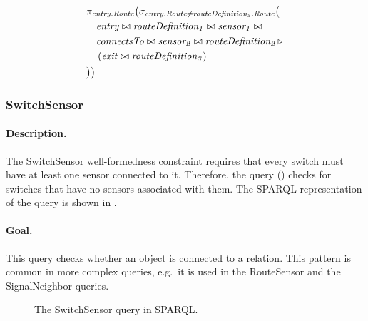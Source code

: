 \begin{align*}
& \pi_{\mathit{entry.Route}} \big( \sigma_{\mathit{entry.Route} \neq \mathit{routeDefinition_2.Route}} \big( \\
& \quad \mathit{entry} \bowtie \mathit{routeDefinition_1} \bowtie \mathit{sensor_1} \bowtie \\
& \quad \mathit{connectsTo} \bowtie \mathit{sensor_2} \bowtie \mathit{routeDefinition_2} \, \triangleright \, \\
& \quad \left( \mathit{exit} \bowtie \mathit{routeDefinition_3} \right) \\
& \big) \big)
\end{align*}

\subsubsection{SwitchSensor}

\paragraph{Description.} The \textsf{SwitchSensor} well-formedness constraint requires that every switch must have at least one sensor connected to it. Therefore, the query () checks for switches that have no sensors associated with them. The SPARQL representation of the query is shown in .

\paragraph{Goal.} This query checks whether an object is connected to a relation. This pattern is common in more complex queries, e.g.\ it is used in the \textsf{RouteSensor} and the \textsf{SignalNeighbor} queries.

\begin{figure}[Htb]
\centering
\begin{minipage}{0.6\textwidth}
  { \alignListing
    }
  \caption{The \textsf{SwitchSensor} query in SPARQL.}
  \label{lst:switchsensor-sparql}
\end{minipage}
\end{figure}

% 
% 


